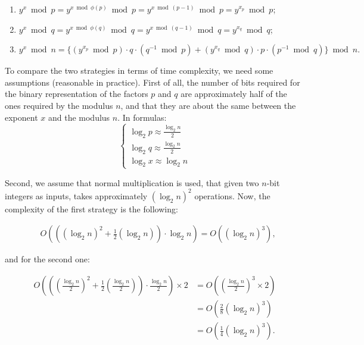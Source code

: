 \begin{enumerate}
  \item $y^x \bmod p = y^{x \bmod \phi(p)} \bmod p = y^{x \bmod (p - 1)} \bmod p = y^{x_p} \bmod p$;
  \item $y^x \bmod q = y^{x \bmod \phi(q)} \bmod q = y^{x \bmod (q - 1)} \bmod q = y^{x_q} \bmod q$;
  \item $ y^x \bmod n = \Big\{ (y^{x_p} \bmod p) \cdot q \cdot (q^{-1} \bmod p) + (y^{x_q} \bmod q) \cdot p \cdot (p^{-1} \bmod q) \Big\} \bmod n. $
\end{enumerate}



To compare the two strategies in terms of time complexity, we need some assumptions (reasonable in practice). First of all, the number of bits required for the binary representation of the factors $p$ and $q$ are approximately half of the ones required by the modulus $n$, and that they are about the same between the exponent $x$ and the modulus $n$. In formulas:
$$
\begin{cases}
  \log_2p \approx \frac{\log_2n}{2} \\
  \log_2q \approx \frac{\log_2n}{2} \\
  \log_2x \approx \log_2n
\end{cases}
$$

Second, we assume that normal multiplication is used, that given two $n$-bit integers as inputs, takes approximately $\left(\log_2n\right)^2$ operations. Now, the complexity of the first strategy is the following:

\begin{align*}
  &O\left(
    \left(
      \left( \log_2n \right)^2 + \frac{1}{2} \left( \log_2n \right)
    \right) \cdot \log_2n
  \right) = O\left(\left( \log_2n \right)^3 \right),
\end{align*}

and for the second one:

\begin{align*}
  O\left(
    \left(
      \left( \frac{\log_2n}{2} \right)^2
      + \frac{1}{2} \left( \frac{\log_2n}{2} \right)
    \right) \cdot \frac{\log_2n}{2}
  \right) \times 2 &= O\left(
    \left( \frac{\log_2n}{2} \right) ^3 \times 2
  \right) \\
  &= O\left(
    \frac{2}{8}
    \left( \log_2n \right) ^3
  \right) \\
  &= O\left(
    \frac{1}{4}
    \left( \log_2n \right) ^3
  \right).
\end{align*}

